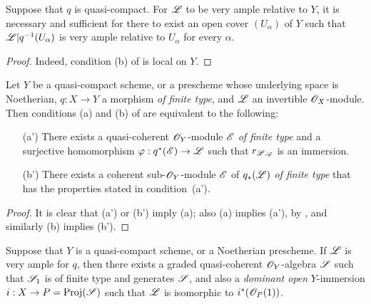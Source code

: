 \begin{corollary}[4.4.5]
\label{II.4.4.5}
Suppose that $q$ is quasi-compact.
For $\mathscr{L}$ to be very ample relative to $Y$, it is necessary and sufficient for there to exist an open cover $(U_\alpha)$ of $Y$ such that $\mathscr{L}|q^{-1}(U_\alpha)$ is very ample relative to $U_\alpha$ for every $\alpha$.
\end{corollary}

\begin{proof}
Indeed, condition (b) of  is local on $Y$.
\end{proof}

\begin{proposition}[4.4.6]
\label{II.4.4.6}
Let $Y$ be a quasi-compact scheme, or a prescheme whose underlying space is Noetherian, $q:X\to Y$ a morphism \emph{of finite type}, and $\mathscr{L}$ an invertible $\mathscr{O}_X$-module.
Then conditions (a) and (b) of  are equivalent to the following:
\begin{enumerate}
  \item[\rm{(a')}] There exists a quasi-coherent $\mathscr{O}_Y$-module $\mathscr{E}$ \emph{of finite type} and a surjective homomorphism $\varphi:q^*(\sh{E})\to\sh{L}$ such that $r_{\mathscr{L},\varphi}$ is an immersion.
  \item[\rm{(b')}] There exists a coherent sub-$\mathscr{O}_Y$-module $\mathscr{E}$ of $q_*(\mathscr{L})$ \emph{of finite type} that has the properties stated in condition~(a').
\end{enumerate}
\end{proposition}

\begin{proof}
It is clear that (a') or (b') imply (a);
also (a) implies (a'), by , and similarly (b) implies (b').
\end{proof}

\begin{corollary}[4.4.7]
\label{II.4.4.7}
Suppose that $Y$ is a quasi-compact scheme, or a Noetherian prescheme.
If $\mathscr{L}$ is very ample for $q$, then there exists a graded quasi-coherent $\mathscr{O}_Y$-algebra $\mathscr{S}$ such that $\mathscr{S}_1$ is of finite type and generates $\mathscr{S}$, and also a \emph{dominant open} $Y$-immersion $i:X\to P=\Proj(\sh{S})$ such that $\mathscr{L}$ is isomorphic to $i^*(\mathscr{O}_P(1))$.
\end{corollary}


